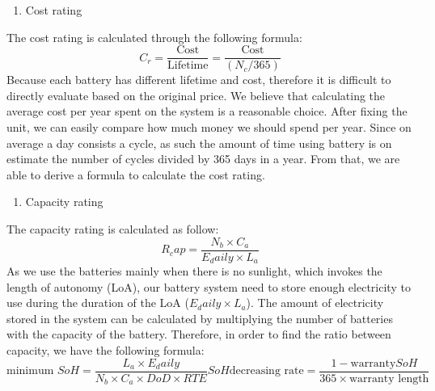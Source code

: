\begin{enumerate}[resume]
    \item Cost rating
\end{enumerate}
The cost rating is calculated through the following formula:
\[
C_r = \frac{\text{Cost}}{\text{Lifetime}} = \frac{\text{Cost}}{(N_c / 365)}
\]
Because each battery has different lifetime and cost, therefore it is difficult to directly evaluate based on the original price. We believe that calculating the average cost per year spent on the system is a reasonable choice. After fixing the unit, we can easily compare how much money we should spend per year. Since on average a day consists a cycle, as such the amount of time using battery is on estimate the number of cycles divided by 365 days in a year. From that, we are able to derive a formula to calculate the cost rating.

\begin{enumerate}[resume]
    \item Capacity rating
\end{enumerate}
The capacity rating is calculated as follow:
\[
R_cap = \frac{N_b \times C_a}{E_daily \times L_a} 
\]
As we use the batteries mainly when there is no sunlight, which invokes the length of autonomy (LoA), our battery system need to store enough electricity to use during the duration of the LoA ($E_daily \times L_a$). The amount of electricity stored in the system can be calculated by multiplying the number of batteries with the capacity of the battery. Therefore, in order to find the ratio between capacity, we have the following formula:
\begin{equation}
    \text{minimum } SoH = \frac{L_a \times E_daily}{N_b \times C_a \times DoD \times RTE}
    SoH \text{decreasing rate} = \frac{1 - \text{warranty} SoH}{365 \times \text{warranty length}}
\end{equation}

